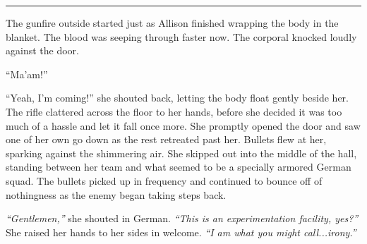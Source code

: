 \begin{Standard}
\fancybreak{* * *}

The gunfire outside started just as Allison finished wrapping the body in the blanket.
The blood was seeping through faster now. The corporal knocked loudly against the door.

``Ma'am!''

``Yeah, I'm coming!'' she shouted back, letting the body float gently beside her.
The rifle clattered across the floor to her hands, before she decided it was too
much of a hassle and let it fall once more. She promptly opened the door and saw
one of her own go down as the rest retreated past her. Bullets flew at her, sparking
against the shimmering air. She skipped out into the middle of the hall, standing between
her team and what seemed to be a specially armored German squad. The bullets picked
up in frequency and continued to bounce off of nothingness as the enemy began taking
steps back.

\emph{``Gentlemen,''} she shouted in German. \emph{``This is an experimentation
facility, yes?''} She raised her hands to her sides in welcome. \emph{``I am what
you might call...irony.''}
\end{Standard}
